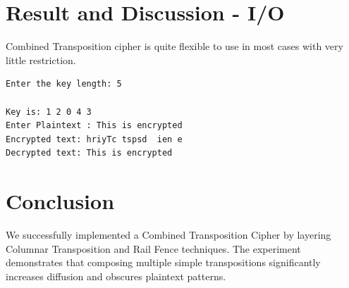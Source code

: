 \section{Result and Discussion - I/O}
Combined Transposition cipher is quite flexible to use in most cases with very little restriction.
\begin{verbatim}
Enter the key length: 5

Key is: 1 2 0 4 3
Enter Plaintext : This is encrypted
Encrypted text: hriyTc tspsd  ien e
Decrypted text: This is encrypted
\end{verbatim}

\section{Conclusion}
We successfully implemented a Combined Transposition Cipher by layering Columnar Transposition and Rail Fence techniques. The experiment demonstrates that composing multiple simple transpositions significantly increases diffusion and obscures plaintext patterns.
